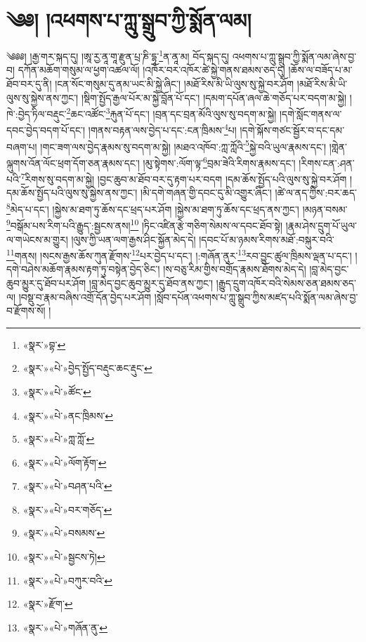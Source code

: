 \chapter{༄༅། །འཕགས་པ་ཀླུ་སྒྲུབ་ཀྱི་སྨོན་ལམ།}༄༅༅། །རྒྱ་གར་སྐད་དུ། །ཨཱ་རྱ་ནཱ་གཱ་རྫུན་པྲ་ཎི་དྷཱ་\footnote{«སྣར་»བྷ་}ན་ནཱ་མ། བོད་སྐད་དུ། འཕགས་པ་ཀླུ་སྒྲུབ་ཀྱི་སྨོན་ལམ་ཞེས་བྱ་བ། དཀོན་མཆོག་གསུམ་ལ་ཕྱག་འཚལ་ལོ། །འཁོར་བར་འཁོར་ཚེ་སྐྱེ་གནས་ཐམས་ཅད་དུ། །ཆོས་ལ་བཟོད་པ་མ་ཐོབ་བར་དུ་ནི། །ངན་སོང་གསུམ་དུ་ནམ་ཡང་མི་སྐྱེ་ཞིང་། །མཐོ་རིས་མི་ཡི་ལུས་སུ་སྐྱེ་བར་ཤོག །མཐོ་རིས་མི་ཡི་ལུས་སུ་སྐྱེས་ནས་ཀྱང་། །སྡིག་སྤྱོད་རྒྱལ་པོར་མ་སྐྱེ་བློན་པོ་དང་། །དམག་དཔོན་ཞལ་ཆེ་གཅོད་པར་བདག་མ་སྐྱེ། །ཁེ་:བྱེད་ཏིལ་བརྡུང་\footnote{«སྣར་»«པེ་»བྱེད་སྤྱོད་བརྡུང་ཆང་རྡུང་}ཆང་འཚོང་\footnote{«སྣར་»«པེ་»ཚོང་}རྐུན་པོ་དང་། །བྲན་དང་བྲན་མོའི་ལུས་སུ་བདག་མ་སྐྱེ། །དགེ་སློང་གནས་ལ་དབང་བྱེད་བདག་པོ་དང་། །གནས་བརྟན་ལས་བྱེད་པ་དང་:ངན་ཁྲིམས་\footnote{«སྣར་»«པེ་»ནང་ཁྲིམས་}པ། །དགེ་སྐོས་གཙང་སྦྱོར་བ་དང་དམ་བཞག་པ། །གང་ཟག་ལས་བྱེད་རྣམས་སུ་བདག་མ་སྐྱེ། །མཐའ་འཁོབ་:ཀླ་ཀློའི་\footnote{«སྣར་»«པེ་»ཀླ་ཀློ་}སྐྱེ་བའི་ཡུལ་རྣམས་དང་། །གླེན་ལྐུགས་འོན་ལོང་ཕྲག་དོག་ཅན་རྣམས་དང་། །མུ་སྟེགས་:ལོག་ལྟ་\footnote{«སྣར་»«པེ་»ལོག་རྟོག་}བྲམ་ཟེའི་རིགས་རྣམས་དང་། །རིགས་ངན་:ཤན་པའི་\footnote{«སྣར་»«པེ་»བཤན་པའི་}རིགས་སུ་བདག་མ་སྐྱེ། །བྱང་ཆུབ་མ་ཐོབ་བར་དུ་རྟག་པར་བདག །དམ་ཆོས་སྤྱོད་པའི་ལུས་སུ་སྐྱེ་བར་ཤོག །དམ་ཆོས་སྤྱོད་པའི་ལུས་སུ་སྐྱེས་ནས་ཀྱང་། །མི་དགེ་གཞན་གྱི་དབང་དུ་མི་འགྱུར་ཞིང་། །ཚེ་ལ་ནད་ཀྱིས་:བར་ཆད་\footnote{«སྣར་»«པེ་»བར་གཅོད་}མེད་པ་དང་། །སྐྱེས་མ་ཐག་ཏུ་ཆོས་དང་ཕྲད་པར་ཤོག །སྐྱེས་མ་ཐག་ཏུ་ཆོས་དང་ཕྲད་ནས་ཀྱང་། །མཉན་བསམ་\footnote{«སྣར་»«པེ་»བསམས་}བསྒོམ་པས་རིག་པའི་རྒྱུད་:སྦྱངས་ནས།\footnote{«སྣར་»«པེ་»སྦྱངས་ཏེ།} །ཏིང་འཛིན་རྩེ་གཅིག་སེམས་ལ་དབང་ཐོབ་སྟེ། །རྣམ་ཤེས་དྲུག་པོ་ཡུལ་ལ་གཡེངས་མ་གྱུར། །ལུས་ཀྱི་ཡན་ལག་རྒྱས་ཤིང་སྐྱོན་མེད་དེ། །དབང་པོ་མ་ཉམས་རིགས་མཐོ་:བསྐུར་བའི་\footnote{«སྣར་»«པེ་»བཀུར་བའི་}གནས། །སངས་རྒྱས་ཆོས་ཀུན་རྫོགས་\footnote{«སྣར་»རྫོག་}པར་བྱེད་པ་དང་། །:གཞོན་ནུར་\footnote{«སྣར་»«པེ་»གཞོན་ནུ་}རབ་བྱུང་ཚུལ་ཁྲིམས་ལྡན་པ་དང་། །དགེ་བཤེས་མཆོག་རྣམས་རྟག་ཏུ་བསྟེན་བྱེད་ཅིང་། །ས་བཅུ་རིམ་གྱིས་བགྲོད་རྣམས་ཐོགས་མེད་དེ། །བླ་མེད་བྱང་ཆུབ་མྱུར་དུ་ཐོབ་པར་ཤོག །བླ་མེད་བྱང་ཆུབ་མྱུར་དུ་ཐོབ་ནས་ཀྱང་། །རྒྱུད་དྲུག་འཁོར་བའི་སེམས་ཅན་ཐམས་ཅད་ལ། །བསྡུ་བ་རྣམ་བཞིས་འགྲོ་དོན་བྱེད་པར་ཤོག །སློབ་དཔོན་འཕགས་པ་ཀླུ་སྒྲུབ་ཀྱིས་མཛད་པའི་སྨོན་ལམ་ཞེས་བྱ་བ་རྫོགས་སོ། །